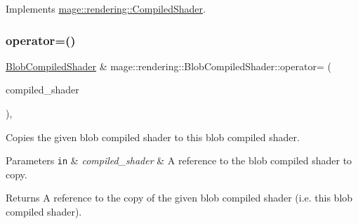 Implements \mbox{\hyperlink{classmage_1_1rendering_1_1_compiled_shader_a8e574ddc7247689426cc15c6c6d416f8}{mage\+::rendering\+::\+Compiled\+Shader}}.

\mbox{\label{classmage_1_1rendering_1_1_blob_compiled_shader_a07f7bf56354508ad499133b821e2fdc5}} 
\subsubsection{\texorpdfstring{operator=()}{operator=()}\hspace{0.1cm}{\footnotesize\ttfamily [1/2]}}
{\footnotesize\ttfamily \mbox{\hyperlink{classmage_1_1rendering_1_1_blob_compiled_shader}{Blob\+Compiled\+Shader}} \& mage\+::rendering\+::\+Blob\+Compiled\+Shader\+::operator= (\begin{DoxyParamCaption}\item[{const \mbox{\hyperlink{classmage_1_1rendering_1_1_blob_compiled_shader}{Blob\+Compiled\+Shader}} \&}]{compiled\+\_\+shader }\end{DoxyParamCaption})\hspace{0.3cm}{\ttfamily [default]}, {\ttfamily [noexcept]}}

Copies the given blob compiled shader to this blob compiled shader.


\begin{DoxyParams}[1]{Parameters}
\mbox{\tt in}  & {\em compiled\+\_\+shader} & A reference to the blob compiled shader to copy. \\
\hline
\end{DoxyParams}
\begin{DoxyReturn}{Returns}
A reference to the copy of the given blob compiled shader (i.\+e. this blob compiled shader). 
\end{DoxyReturn}
\mbox{\label{classmage_1_1rendering_1_1_blob_compiled_shader_a14954683e57897937b0e0178b5a726a4}} 
